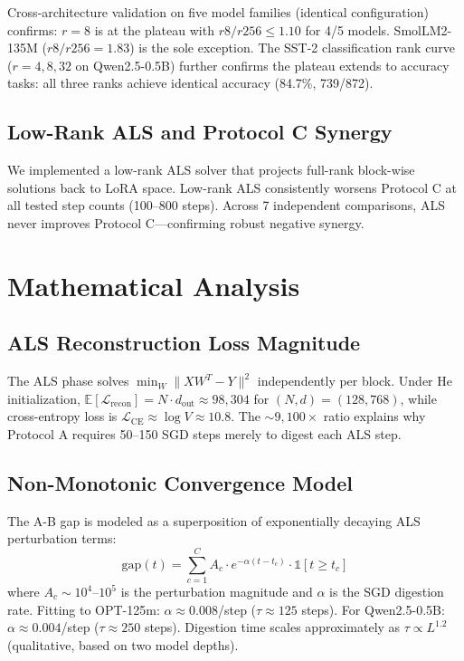 \documentclass[11pt]{article}
\begin{document}
Cross-architecture validation on five model families (identical configuration) confirms: $r=8$ is at the plateau with $r8/r256 \leq 1.10$ for 4/5 models. SmolLM2-135M ($r8/r256=1.83$) is the sole exception. The SST-2 classification rank curve ($r=4,8,32$ on Qwen2.5-0.5B) further confirms the plateau extends to accuracy tasks: all three ranks achieve identical accuracy (84.7\%, 739/872).

\subsection{Low-Rank ALS and Protocol C Synergy}

We implemented a low-rank ALS solver that projects full-rank block-wise solutions back to LoRA space. Low-rank ALS consistently worsens Protocol C at all tested step counts (100--800 steps). Across 7 independent comparisons, ALS never improves Protocol C---confirming robust negative synergy.

\section{Mathematical Analysis}

\subsection{ALS Reconstruction Loss Magnitude}

The ALS phase solves $\min_W \|X W^T - Y\|^2$ independently per block. Under He initialization, $\mathbb{E}[\mathcal{L}_{\text{recon}}] = N \cdot d_{\text{out}} \approx 98,304$ for $(N,d)=(128,768)$, while cross-entropy loss is $\mathcal{L}_{\text{CE}} \approx \log V \approx 10.8$. The $\sim 9,100\times$ ratio explains why Protocol A requires 50--150 SGD steps merely to digest each ALS step.

\subsection{Non-Monotonic Convergence Model}

The A-B gap is modeled as a superposition of exponentially decaying ALS perturbation terms:
\begin{equation}
\text{gap}(t) = \sum_{c=1}^{C} A_c \cdot e^{-\alpha (t - t_c)} \cdot \mathbb{1}[t \geq t_c]
\end{equation}
where $A_c \sim 10^4$--$10^5$ is the perturbation magnitude and $\alpha$ is the SGD digestion rate. Fitting to OPT-125m: $\alpha \approx 0.008$/step ($\tau \approx 125$ steps). For Qwen2.5-0.5B: $\alpha \approx 0.004$/step ($\tau \approx 250$ steps). Digestion time scales approximately as $\tau \propto L^{1.2}$ (qualitative, based on two model depths).
\end{document}
